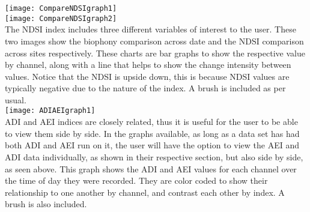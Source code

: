 \texttt{[image: CompareNDSIgraph1]}\\
\texttt{[image: CompareNDSIgraph2]}\\
The NDSI index includes three different variables of interest to the user. These two images show the biophony comparison across date and the NDSI comparison across sites respectively. These charts are bar graphs to show the respective value by channel, along with a line that helps to show the change intensity between values. Notice that the NDSI is upside down, this is because NDSI values are typically negative due to the nature of the index. A brush is included as per usual.\\

\texttt{[image: ADIAEIgraph1]}\\
ADI and AEI indices are closely related, thus it is useful for the user to be able to view them side by side. In the graphs available, as long as a data set has had both ADI and AEI run on it, the user will have the option to view the AEI and ADI data individually, as shown in their respective section, but also side by side, as seen above. This graph shows the ADI and AEI values for each channel over the time of day they were recorded. They are color coded to show their relationship to one another by channel, and contrast each other by index. A brush is also included.
